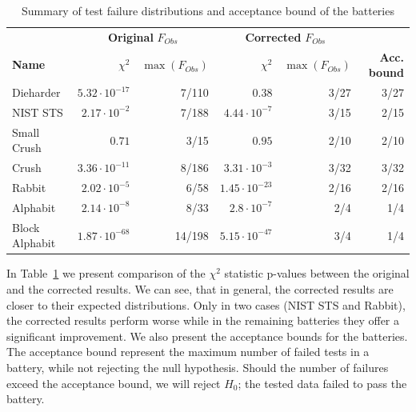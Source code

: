 \documentclass[
  digital,  	%
  color,		%
  oneside,   	%
  12pt,
  nocover,
  notable,
  nolof,
  nolot,
]{fithesis3}
\newcommand{\gr}{\cellcolor{green!40}}
\theoremstyle{definition}
\theoremstyle{remark}
\begin{document}
\begin{table}[H]
\begin{nomar}
\centering

\begin{tabular}{@{}lrrrrr@{}} \toprule
& \multicolumn{2}{c}{\textbf{Original} $F_{Obs}$} & \multicolumn{2}{c}{\textbf{Corrected} $F_{Obs}$} &  \\ \cmidrule(lr){2-3} \cmidrule(lr){4-5}
\textbf{Name} & $\chi^2$ & $\max(F_{Obs})$& $\chi^2$ & $\max(F_{Obs})$ & \textbf{Acc. bound} \\ \midrule
Dieharder      & $5.32 \cdot 10^{-17}$    &  7/110 & \gr$0.38$                & 3/27 & 3/27 \\
NIST STS       & \gr$2.17 \cdot 10^{-2}$  &  7/188 & $4.44 \cdot 10^{-7}$     & 3/15 & 2/15 \\
Small Crush    & $0.71$                   &   3/15 & \gr$0.95$                & 2/10 & 2/10 \\
Crush          & $3.36 \cdot 10^{-11}$    &  8/186 & \gr$3.31 \cdot 10^{-3}$  & 3/32 & 3/32 \\
Rabbit         & \gr$2.02 \cdot 10^{-5}$  &   6/58 & $1.45 \cdot 10^{-23}$    & 2/16 & 2/16 \\
Alphabit       & $2.14 \cdot 10^{-8}$     &   8/33 & \gr$2.8 \cdot 10^{-7}$   & 2/4  & 1/4 \\
Block Alphabit & $1.87 \cdot 10^{-68}$    & 14/198 & \gr$5.15 \cdot 10^{-47}$ & 3/4  & 1/4 \\ \bottomrule
\end{tabular}

\end{nomar}
\caption{Summary of test failure distributions and acceptance bound of the batteries}
\label{tab:baseline_summary}
\end{table}

In Table~\ref{tab:baseline_summary} we present comparison of the $\chi^2$ statistic p-values between the original and the corrected results. We can see, that in general, the corrected results are closer to their expected distributions. Only in two cases (NIST STS and Rabbit), the corrected results perform worse while in the remaining batteries they offer a significant improvement. We also present the acceptance bounds for the batteries. The acceptance bound represent the maximum number of failed tests in a battery, while not rejecting the null hypothesis. Should the number of failures exceed the acceptance bound, we will reject $H_0$; the tested data failed to pass the battery.
\end{document}
